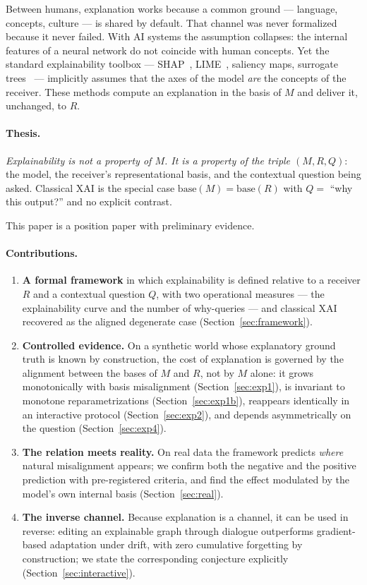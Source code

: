 \documentclass[10pt]{article}
\theoremstyle{definition}
\theoremstyle{plain}
\begin{document}
Between humans, explanation works because a common ground --- language, concepts, culture --- is shared by default. That channel was never formalized because it never failed. With AI systems the assumption collapses: the internal features of a neural network do not coincide with human concepts. Yet the standard explainability toolbox --- SHAP~\citep{lundberg2017unified}, LIME~\citep{ribeiro2016why}, saliency maps, surrogate trees~\citep{craven1996extracting,frosst2017distilling} --- implicitly assumes that the axes of the model \emph{are} the concepts of the receiver. These methods compute an explanation in the basis of $M$ and deliver it, unchanged, to $R$.

\paragraph{Thesis.} \emph{Explainability is not a property of $M$. It is a property of the triple $(M, R, Q)$}: the model, the receiver's representational basis, and the contextual question being asked. Classical XAI is the special case $\mathrm{base}(M) = \mathrm{base}(R)$ with $Q =$ ``why this output?'' and no explicit contrast.

This paper is a position paper with preliminary evidence.

\paragraph{Contributions.}
\begin{enumerate}[label=(\roman*),leftmargin=2.4em]
  \item \textbf{A formal framework} in which explainability is defined relative to a receiver $R$ and a contextual question $Q$, with two operational measures --- the explainability curve and the number of why-queries --- and classical XAI recovered as the aligned degenerate case (Section~\ref{sec:framework}).
  \item \textbf{Controlled evidence.} On a synthetic world whose explanatory ground truth is known by construction, the cost of explanation is governed by the alignment between the bases of $M$ and $R$, not by $M$ alone: it grows monotonically with basis misalignment (Section~\ref{sec:exp1}), is invariant to monotone reparametrizations (Section~\ref{sec:exp1b}), reappears identically in an interactive protocol (Section~\ref{sec:exp2}), and depends asymmetrically on the question (Section~\ref{sec:exp4}).
  \item \textbf{The relation meets reality.} On real data the framework predicts \emph{where} natural misalignment appears; we confirm both the negative and the positive prediction with pre-registered criteria, and find the effect modulated by the model's own internal basis (Section~\ref{sec:real}).
  \item \textbf{The inverse channel.} Because explanation is a channel, it can be used in reverse: editing an explainable graph through dialogue outperforms gradient-based adaptation under drift, with zero cumulative forgetting by construction; we state the corresponding conjecture explicitly (Section~\ref{sec:interactive}).
\end{enumerate}
\end{document}
